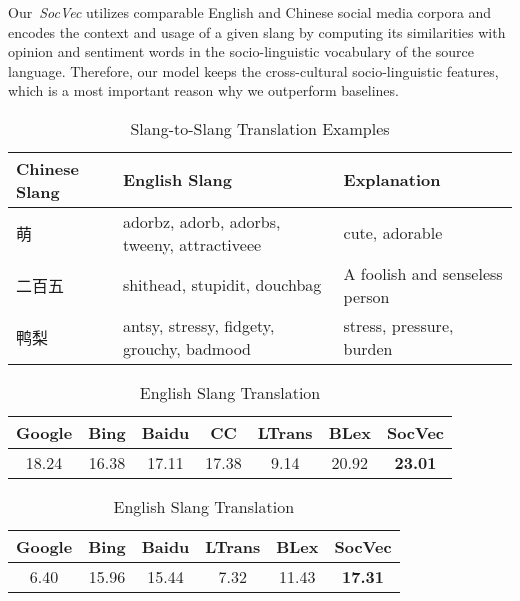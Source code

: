 Our~\textit{SocVec} utilizes comparable English and Chinese social media corpora and encodes the context and usage of a given slang by computing its similarities with opinion and sentiment words in the socio-linguistic vocabulary of the source language. Therefore, our model keeps the cross-cultural socio-linguistic features, which is a most important reason why we outperform baselines.
\begin{table}[th]
	\small
	\centering
	\caption{\small Slang-to-Slang Translation Examples}
	\begin{tabular}{|C{1.92cm}|L{3.0cm}|L{2.2cm}|}
		\hline
		\textbf{Chinese Slang} & \textbf{English Slang} & \textbf{Explanation} \\ \hline
		萌 & adorbz, adorb, adorbs, tweeny, attractiveee & cute, adorable \\ \hline
		二百五 & shithead, stupidit, douchbag & A foolish and senseless person\\ \hline
		鸭梨 & antsy, stressy, fidgety, grouchy, badmood & stress, pressure, burden \\ \hline
	\end{tabular}
	\label{tab:bleis_4}
\end{table}

\begin{table}[th] 
	\small
	\centering
	\caption{\small ACS Result of Slang Translation}
	\begin{subtable}[h]{\columnwidth}
		\small
		\centering
		\begin{tabular}{|c|c|c|c|c|c|c|}
		\hline
		Google&  Bing& Baidu & CC & LTrans  & BLex  & SocVec \\ \hline
		18.24 &  16.38&  17.11 & 17.38& 9.14&  20.92& \textbf{23.01} \\ \hline
		\end{tabular}
	 	\caption{\small Chinese Slang Translation}
		\label{tab:bleis_1}
	\end{subtable}
	\vfill
	\begin{subtable}[h]{\columnwidth}
		\small
		\centering
		\begin{tabular}{|c|c|c|c|c|c|}
			\hline
			Google &  Bing & Baidu & LTrans & BLex  & SocVec  \\ \hline
			6.40 &  15.96 &  15.44 &  7.32 &  11.43& \textbf{17.31} \\ \hline  
		\end{tabular}
		\caption{\small English Slang Translation}
		\label{tab:bleis_2}
	\end{subtable}
\end{table}
